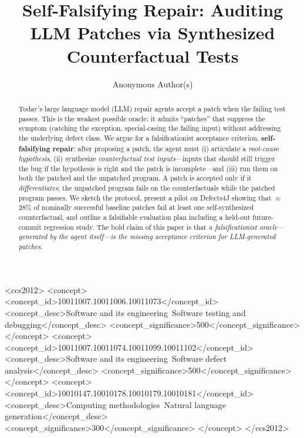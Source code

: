 \documentclass[sigconf,review,anonymous,nonacm]{acmart}
\begin{document}
\title{Self-Falsifying Repair: Auditing LLM Patches via Synthesized Counterfactual Tests}

\author{Anonymous Author(s)}

\renewcommand{\shortauthors}{Anonymous}

\begin{abstract}
Today's large language model (LLM) repair agents accept a patch when the
failing test passes. This is the weakest possible oracle: it admits
``patches'' that suppress the symptom (catching the exception, special-casing
the failing input) without addressing the underlying defect class. We argue
for a falsificationist acceptance criterion, \textbf{self-falsifying
repair}: after proposing a patch, the agent must (i) articulate a
\emph{root-cause hypothesis}, (ii) synthesize \emph{counterfactual test
inputs}---inputs that should still trigger the bug if the hypothesis is
right and the patch is incomplete---and (iii) run them on both the
patched and the unpatched program. A patch is accepted only if it
\emph{differentiates}: the unpatched program fails on the counterfactuals
while the patched program passes. We sketch the protocol, present a pilot
on Defects4J showing that $\approx$28\% of nominally successful baseline
patches fail at least one self-synthesized counterfactual, and outline a
falsifiable evaluation plan including a held-out future-commit regression
study. The bold claim of this paper is that \emph{a falsificationist
oracle---generated by the agent itself---is the missing acceptance
criterion for LLM-generated patches}.
\end{abstract}

\begin{CCSXML}
<ccs2012>
 <concept>
  <concept_id>10011007.10011006.10011073</concept_id>
  <concept_desc>Software and its engineering~Software testing and debugging</concept_desc>
  <concept_significance>500</concept_significance>
 </concept>
 <concept>
  <concept_id>10011007.10011074.10011099.10011102</concept_id>
  <concept_desc>Software and its engineering~Software defect analysis</concept_desc>
  <concept_significance>500</concept_significance>
 </concept>
 <concept>
  <concept_id>10010147.10010178.10010179.10010181</concept_id>
  <concept_desc>Computing methodologies~Natural language generation</concept_desc>
  <concept_significance>300</concept_significance>
 </concept>
</ccs2012>
\end{CCSXML}
\end{document}
